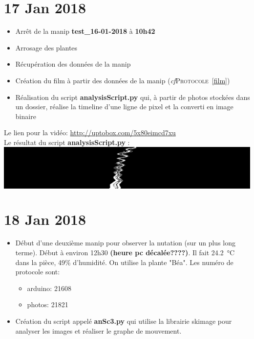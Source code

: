 \documentclass[10pt,a4paper]{article}
\begin{document}
\section{17 Jan 2018}
\begin{itemize}
        \item Arrêt de la manip \textbf{test\_16-01-2018} à \textbf{10h42}
        \item Arrosage des plantes
        \item Récupération des données de la manip
        \item Création du film à partir des données de la manip (\textit{cf}\textsc{Protocole}~\ref{film})
        \item Réalisation du script \textbf{analysisScript.py} qui, à partir de photos stockées dans un dossier, réalise la timeline d'une ligne de pixel et la converti en image binaire
\end{itemize}

Le lien pour la vidéo: \url{http://uptobox.com/5x80eimcd7xu}\\

Le résultat du script \textbf{analysisScript.py} :\\
\includegraphics[width = \linewidth]{imTLBWv1.jpg}

\section{18 Jan 2018}
\begin{itemize}
        \item Début d'une deuxième manip pour observer la nutation (sur un plus long terme). Début à environ 12h30 \textbf{(heure pc décalée????)}. Il fait \SI{24.2}{\celsius} dans la pièce, 49\% d'humidité. On utilise la plante "Béa". Les numéro de protocole sont:
                \begin{itemize}
                        \item arduino: 21608
                        \item photos: 21821
                \end{itemize}
        \item Création du script appelé \textbf{anSc3.py} qui utilise la librairie skimage pour analyser les images et réaliser le graphe de mouvement.

\end{itemize}
\end{document}
